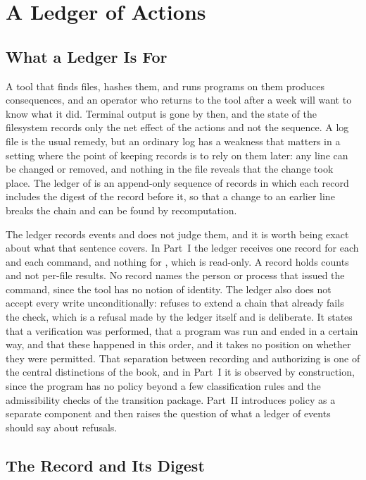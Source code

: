 \chapter{A Ledger of Actions}
\label{ch:ledger}

\section{What a Ledger Is For}

A tool that finds files, hashes them, and runs programs on them produces consequences, and an operator who returns to the tool after a week will want to know what it did. Terminal output is gone by then, and the state of the filesystem records only the net effect of the actions and not the sequence. A log file is the usual remedy, but an ordinary log has a weakness that matters in a setting where the point of keeping records is to rely on them later: any line can be changed or removed, and nothing in the file reveals that the change took place. The ledger of \golab{} is an append-only sequence of records in which each record includes the digest of the record before it, so that a change to an earlier line breaks the chain and can be found by recomputation.

The ledger records events and does not judge them, and it is worth being exact about what that sentence covers. In Part~I the ledger receives one record for each  and each  command, and nothing for , which is read-only. A  record holds counts and not per-file results. No record names the person or process that issued the command, since the tool has no notion of identity. The ledger also does not accept every write unconditionally:  refuses to extend a chain that already fails the check, which is a refusal made by the ledger itself and is deliberate. It states that a verification was performed, that a program was run and ended in a certain way, and that these happened in this order, and it takes no position on whether they were permitted. That separation between recording and authorizing is one of the central distinctions of the book, and in Part~I it is observed by construction, since the program has no policy beyond a few classification rules and the admissibility checks of the transition package. Part~II introduces policy as a separate component and then raises the question of what a ledger of events should say about refusals.

\section{The Record and Its Digest}

